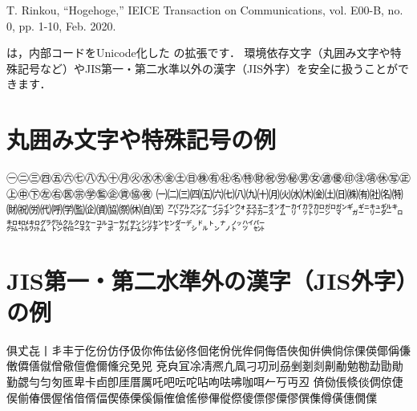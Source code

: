 \documentclass[rinkou,a4paper]{ieicej}
\begin{document}
\begin{thebibliography}{9} %
	T. Rinkou, ``Hogehoge,'' IEICE Transaction on Communications, vol. E00-B, no. 0, pp. 1-10, Feb. 2020.
\end{thebibliography}

\appendix
{}

\upLaTeX は，内部コードをUnicode化した \pLaTeX の拡張です．
環境依存文字（丸囲み文字や特殊記号など）やJIS第一・第二水準以外の漢字（JIS外字）を安全に扱うことができます．

\section{丸囲み文字や特殊記号の例}
㊀㊁㊂㊃㊄㊅㊆㊇㊈㊉㊊㊋㊌㊍㊎㊏㊐㊑㊒㊓㊔㊕㊖㊗㊘㊙㊚㊛㊜㊝㊞㊟㊠㊡㊢㊣㊤㊥㊦㊧㊨㊩㊪㊫㊬㊭㊮㊯㊰
㈠㈡㈢㈣㈤㈥㈦㈧㈨㈩㈪㈫㈬㈭㈮㈯㈰㈱㈲㈳㈴㈵㈶㈷㈸㈹㈺㈻㈼㈽㈾㈿㉀㉁㉂㉃
㌀㌁㌂㌃㌄㌅㌆㌇㌈㌉㌊㌋㌌㌍㌎㌏㌐㌑㌒㌓㌔㌕㌖㌗㌘㌙㌚㌛㌜㌝㌞㌟㌠㌡㌢㌣㌤㌥㌦㌧㌨㌩㌪㌫

\section{JIS第一・第二水準外の漢字（JIS外字）の例}
俱𠀋㐂丨丯丰亍仡份仿伃伋你佈佉佖佟佪佬佾侊侔侗侮俉俠倁倂倎倘倧倮偀倻偁傔僌僲僐僦僧儆儃儋儞儵兊免兕
兗㒵冝凃凊凞凢凮刁㓛刓刕剉剗剡劓勈勉勌勐勖勛勤勰勻匀匇匜卑卡卣卽厓厝厲吒吧呍咜呫呴呿咈咖咡𠂉丂丏丒
㑪俲倀倐倓倜倞倢㑨偂偆偎偓偗偣偦偪偰傣傈傒傓傕傖傜傪𠌫傱傺傻僄僇僳僇僎𠍱僔僙僡僩㒒
\end{document}
